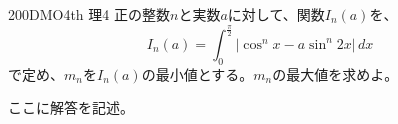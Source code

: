 \begin{thm}{200}{\maru}{DMO4th 理4}
 正の整数$n$と実数$a$に対して、関数$I_n(a)$を、
 \[ I_n(a)=\int_0^{\frac{\pi}{2}}\! \left|\cos^n x-a\sin^n2x\right| \,dx \]
 で定め、$m_n$を$I_n(a)$の最小値とする。$m_n$の最大値を求めよ。
\end{thm}

ここに解答を記述。